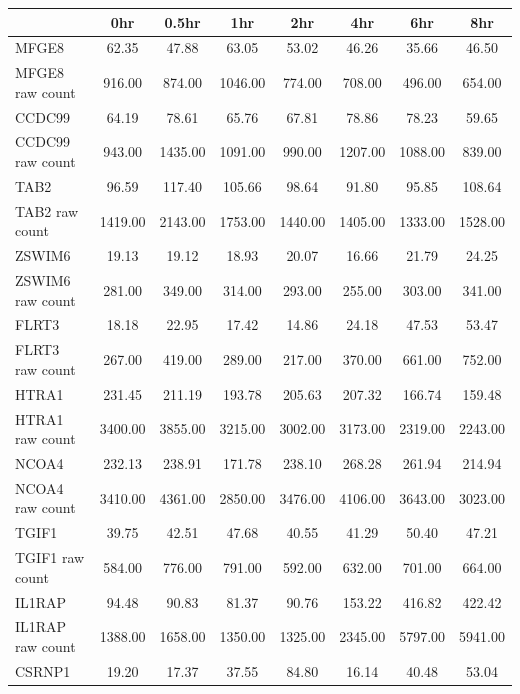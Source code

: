 \begin{table}[ht]
\begin{tabular}{l|ccccccc}
  \hline
\rowcolor{MidnightBlue!50}
& 0hr & 0.5hr & 1hr & 2hr & 4hr & 6hr & 8hr \\
  \hline
MFGE8 & 62.35 & 47.88 & 63.05 & 53.02 & 46.26 & 35.66 & 46.50 \\
  MFGE8 raw count & 916.00 & 874.00 & 1046.00 & 774.00 & 708.00 & 496.00 & 654.00 \\
  CCDC99 & 64.19 & 78.61 & 65.76 & 67.81 & 78.86 & 78.23 & 59.65 \\
  CCDC99 raw count & 943.00 & 1435.00 & 1091.00 & 990.00 & 1207.00 & 1088.00 & 839.00 \\
  TAB2 & 96.59 & 117.40 & 105.66 & 98.64 & 91.80 & 95.85 & 108.64 \\
  TAB2 raw count & 1419.00 & 2143.00 & 1753.00 & 1440.00 & 1405.00 & 1333.00 & 1528.00 \\
  ZSWIM6 & 19.13 & 19.12 & 18.93 & 20.07 & 16.66 & 21.79 & 24.25 \\
  ZSWIM6 raw count & 281.00 & 349.00 & 314.00 & 293.00 & 255.00 & 303.00 & 341.00 \\
  FLRT3 & 18.18 & 22.95 & 17.42 & 14.86 & 24.18 & 47.53 & 53.47 \\
  FLRT3 raw count & 267.00 & 419.00 & 289.00 & 217.00 & 370.00 & 661.00 & 752.00 \\
  HTRA1 & 231.45 & 211.19 & 193.78 & 205.63 & 207.32 & 166.74 & 159.48 \\
  HTRA1 raw count & 3400.00 & 3855.00 & 3215.00 & 3002.00 & 3173.00 & 2319.00 & 2243.00 \\
  NCOA4 & 232.13 & 238.91 & 171.78 & 238.10 & 268.28 & 261.94 & 214.94 \\
  NCOA4 raw count & 3410.00 & 4361.00 & 2850.00 & 3476.00 & 4106.00 & 3643.00 & 3023.00 \\
  TGIF1 & 39.75 & 42.51 & 47.68 & 40.55 & 41.29 & 50.40 & 47.21 \\
  TGIF1 raw count & 584.00 & 776.00 & 791.00 & 592.00 & 632.00 & 701.00 & 664.00 \\
  IL1RAP & 94.48 & 90.83 & 81.37 & 90.76 & 153.22 & 416.82 & 422.42 \\
  IL1RAP raw count & 1388.00 & 1658.00 & 1350.00 & 1325.00 & 2345.00 & 5797.00 & 5941.00 \\
  CSRNP1 & 19.20 & 17.37 & 37.55 & 84.80 & 16.14 & 40.48 & 53.04 \\

\end{tabular}
\end{table}
